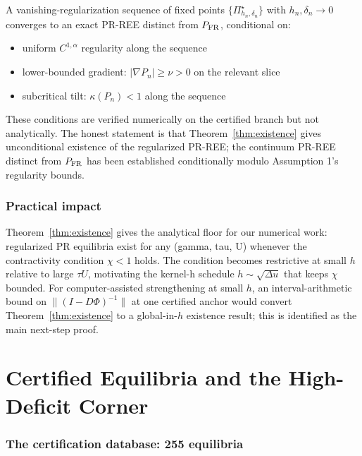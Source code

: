 \documentclass[11pt]{article}
\newcommand{\1}{\mathbf{1}}
\newcommand{\PFR}{P_{\rm FR}}
\begin{document}
A vanishing-regularization sequence of fixed points
$\{\Pi^\star_{h_n, \delta_n}\}$ with $h_n, \delta_n \to 0$ converges to
an exact PR-REE distinct from $\PFR$, conditional on:
\begin{itemize}
\item uniform $C^{1, \alpha}$ regularity along the sequence
\item lower-bounded gradient: $|\nabla P_n| \ge \nu > 0$ on the relevant slice
\item subcritical tilt: $\kappa(P_n) < 1$ along the sequence
\end{itemize}

These conditions are verified numerically on the certified branch but
not analytically.  The honest statement is that Theorem~\ref{thm:existence}
gives unconditional existence of the regularized PR-REE; the continuum
PR-REE distinct from $\PFR$ has been established conditionally
modulo Assumption 1's regularity bounds.

\section{Practical impact}

Theorem~\ref{thm:existence} gives the analytical floor for our
numerical work: regularized PR equilibria exist for any (gamma, tau, U)
whenever the contractivity condition $\chi < 1$ holds.  The condition
becomes restrictive at small $h$ relative to large $\tau U$, motivating
the kernel-h schedule $h \sim \sqrt{\Delta u}$ that keeps $\chi$ bounded.
For computer-assisted strengthening at small $h$, an interval-arithmetic
bound on $\|(I - D\Phi)^{-1}\|$ at one certified anchor would convert
Theorem~\ref{thm:existence} to a global-in-$h$ existence result; this is
identified as the main next-step proof.

\part{Certified Equilibria and the High-Deficit Corner}

\section{The certification database: 255 equilibria}
\label{sec:cert}
\end{document}
